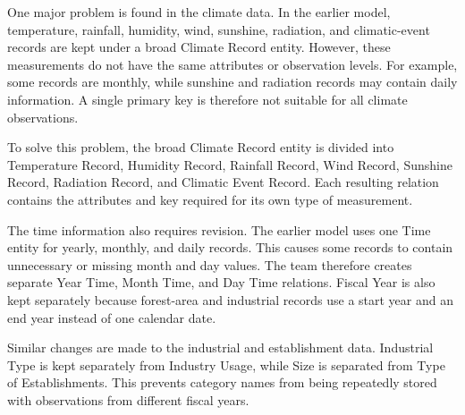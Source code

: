 One major problem is found in the climate data. In the earlier model,
temperature, rainfall, humidity, wind, sunshine, radiation, and climatic-event
records are kept under a broad Climate Record entity. However, these
measurements do not have the same attributes or observation levels. For
example, some records are monthly, while sunshine and radiation records may
contain daily information. A single primary key is therefore not suitable for
all climate observations.

To solve this problem, the broad Climate Record entity is divided into
Temperature Record, Humidity Record, Rainfall Record, Wind Record, Sunshine
Record, Radiation Record, and Climatic Event Record. Each resulting relation
contains the attributes and key required for its own type of measurement.

The time information also requires revision. The earlier model uses one Time
entity for yearly, monthly, and daily records. This causes some records to
contain unnecessary or missing month and day values. The team therefore
creates separate Year Time, Month Time, and Day Time relations. Fiscal Year is
also kept separately because forest-area and industrial records use a start
year and an end year instead of one calendar date.

Similar changes are made to the industrial and establishment data. Industrial
Type is kept separately from Industry Usage, while Size is separated from Type
of Establishments. This prevents category names from being repeatedly stored
with observations from different fiscal years.

